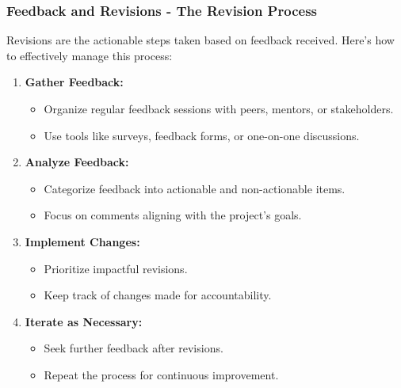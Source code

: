 \documentclass[aspectratio=169]{beamer}
\begin{document}
\begin{frame}[fragile]
    \frametitle{Feedback and Revisions - The Revision Process}
    Revisions are the actionable steps taken based on feedback received. Here's how to effectively manage this process:
    
    \begin{enumerate}
        \item \textbf{Gather Feedback:}
            \begin{itemize}
                \item Organize regular feedback sessions with peers, mentors, or stakeholders.
                \item Use tools like surveys, feedback forms, or one-on-one discussions.
            \end{itemize}
        \item \textbf{Analyze Feedback:}
            \begin{itemize}
                \item Categorize feedback into actionable and non-actionable items.
                \item Focus on comments aligning with the project's goals.
            \end{itemize}
        \item \textbf{Implement Changes:}
            \begin{itemize}
                \item Prioritize impactful revisions.
                \item Keep track of changes made for accountability.
            \end{itemize}
        \item \textbf{Iterate as Necessary:}
            \begin{itemize}
                \item Seek further feedback after revisions.
                \item Repeat the process for continuous improvement.
            \end{itemize}
    \end{enumerate}
\end{frame}
\end{document}
